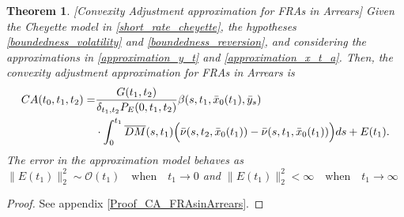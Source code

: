\documentclass[a4paper,10pt]{article}
\newtheorem{theorem}{Theorem}[section]
\newcommand{\1}{\mathbf{1}}
\begin{document}
\begin{theorem}\label{Th_CA_FRAsinArrears}[Convexity Adjustment approximation for FRAs in Arrears]
Given the Cheyette model in \eqref{short_rate_cheyette}, the hypotheses \ref{boundedness_volatility} and \ref{boundedness_reversion}, and considering the approximations in \eqref{approximation_y_t} and \eqref{approximation_x_t_a}. Then, the convexity adjustment approximation for FRAs in Arrears is 
\begin{align}\label{ca_approximations_fra_arrears}
CA(t_0,t_1,t_2) =   &\frac{G(t_1,t_2)}{\delta_{t_1,t_2}P_{E}(0,t_1,t_2)} \beta(s,t_1, \bar{x}_0(t_1), \bar{y}_s) \nonumber \\
&\cdot \int_{0}^{t_1} \overline{DM}(s,t_1) \Bigl(\bar{\nu}(s,t_2,\bar{x}_{0}(t_1))-\bar{\nu}(s,t_1,\bar{x}_{0}(t_1))\Bigr) ds  + E(t_1).
\end{align}
The error in the approximation model behaves as $\|E(t_1)\|^{2}_{2} \sim \mathcal{O}(t_1) \quad \text{when} \quad t_1 \to 0$ and $\|E(t_1)\|^{2}_{2} < \infty \quad \text{when} \quad t_1 \to \infty$
\end{theorem}
\begin{proof}
See appendix \ref{Proof_CA_FRAsinArrears}.
\end{proof}
\end{document}
